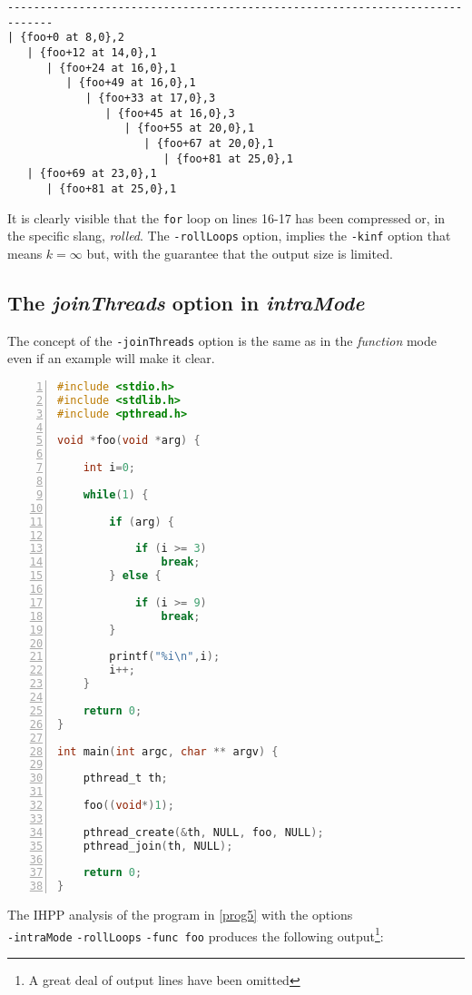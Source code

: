 \documentclass[a4paper,10pt]{report}
\begin{document}
\begin{lstlisting}[label=out10, caption={an output of IHPP with rollLoops option}]
-----------------------------------------------------------------------------
| {foo+0 at 8,0},2
   | {foo+12 at 14,0},1
      | {foo+24 at 16,0},1
         | {foo+49 at 16,0},1
            | {foo+33 at 17,0},3
               | {foo+45 at 16,0},3
                  | {foo+55 at 20,0},1
                     | {foo+67 at 20,0},1
                        | {foo+81 at 25,0},1
   | {foo+69 at 23,0},1
      | {foo+81 at 25,0},1
\end{lstlisting}

It is clearly visible that the \verb|for| loop on lines 16-17
has been compressed or, in the specific slang, \emph{rolled}.
The \verb|-rollLoops| option, implies the \verb|-kinf| option
that means $k=\infty$ but, with the guarantee that
the output size is limited.

\subsection{The \emph{joinThreads} option in \emph{intraMode}}

The concept of the \verb|-joinThreads| option is the same as in the
\emph{function} mode even if an example will make it clear.

\begin{lstlisting}[language=C,
	caption={prog5.c, an example program}, label=prog5, frame=leftline, numbers=left]
#include <stdio.h>
#include <stdlib.h>
#include <pthread.h>

void *foo(void *arg) {

	int i=0;

	while(1) {

		if (arg) {

			if (i >= 3)
				break;
		} else {

			if (i >= 9)
				break;
		}

		printf("%i\n",i);
		i++;
	}

	return 0;
}

int main(int argc, char ** argv) {

	pthread_t th;

	foo((void*)1);

	pthread_create(&th, NULL, foo, NULL);
	pthread_join(th, NULL);

	return 0;
}

\end{lstlisting}

\noindent
The IHPP analysis of the program in \cref{prog5} with the options\\\verb|-intraMode| \verb|-rollLoops| \verb|-func foo| produces the following output\footnote{A great deal of output lines have been omitted}:
\end{document}
